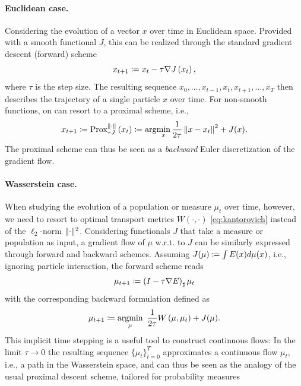 
\paragraph{Euclidean case.}
Considering the evolution of a vector $x$ over time in Euclidean space. Provided with a smooth functional $J$, this can be realized through the standard gradient descent (forward) scheme
\begin{equation*}
	x_{t+1} \coloneqq x_{t}-\tau \nabla J\left(x_{t}\right),
\end{equation*}
where $\tau$ is the step size. The resulting sequence ${x_0, \dots, x_{t-1}, x_{t}, x_{t+1}, \dots, x_T}$ then describes the trajectory of a single particle $x$ over time.
For non-smooth functions, on can resort to a proximal scheme, i.e.,
\begin{equation*}
	x_{t+1} \coloneqq \operatorname{Prox}_{\tau J}^{\|\cdot\|}\left(x_{t}\right) \coloneqq \arg\!\min_x \frac{1}{2\tau}\left\| x-x_t\right\|^2+ J(x).
\end{equation*}
The proximal scheme can thus be seen as a \emph{backward} Euler discretization of the gradient flow.

\paragraph{Wasserstein case.}
When studying the evolution of a population or measure $\mu_t$ over time, however, we need to resort to optimal transport metrics $W(\cdot, \cdot)$ \eqref{eq:kantorovich} instead of the $\ell_2$-norm $\lVert\cdot\rVert^2$.
Considering functionals $J$ that take a measure or population as input, a gradient flow of $\mu$ w.r.t. to $J$ can be similarly expressed through forward and backward schemes. Assuming $J(\mu) 
\coloneqq \int E(x) d \mu(x)$, i.e., ignoring particle interaction, the forward scheme reads
\begin{equation*}
	\mu_{t+1}\coloneqq\left(I-\tau \nabla E\right)_{\sharp} \mu_t
\end{equation*}
with the corresponding backward formulation defined as
\begin{equation}
	\label{eq:jko}
	\mu_{t+1}\coloneqq\underset{\mu}{\operatorname{argmin}} \enspace \frac{1}{2\tau}W\left(\mu, \mu_t\right)+ J(\mu).
\end{equation}
This implicit time stepping is a useful tool to construct continuous flows: In the limit $\tau \rightarrow 0$ the resulting sequence $\{\mu_t\}_{t=0}^T$ approximates a continuous flow $\mu_t$, i.e., a path in the Wasserstein space, and can thus be seen as the analogy of the usual proximal descent scheme, tailored for probability measures~\citep[p.285]{santambrogio2015optimal}

